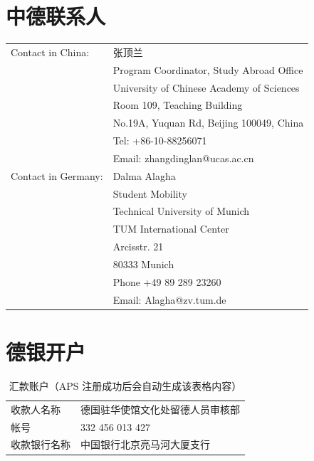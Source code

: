 \documentclass[oneside,final]{book}
\begin{document}
\begin{appendices}

\chapter{中德联系人}

\begin{table}[!htbp]
\centering
\label{tb:contacts}
\begin{tabular}{ll}
\toprule
Contact in China: & 张顶兰 \\
& Program Coordinator, Study Abroad Office \\
& University of Chinese Academy of Sciences \\
& Room 109, Teaching Building \\
& No.19A, Yuquan Rd, Beijing 100049, China \\
& Tel: +86-10-88256071 \\
& Email: zhangdinglan@ucas.ac.cn \\ \midrule
Contact in Germany: & Dalma Alagha \\
& Student Mobility \\
& Technical University of Munich\\
& TUM International Center \\
& Arcisstr. 21 \\
& 80333 Munich \\
& Phone +49 89 289 23260 \\
& Email: Alagha@zv.tum.de \\ \bottomrule
\end{tabular}
\end{table}

\newpage

\chapter{德银开户}\label{ap:bank}
\begin{table}[htbp]
  \caption{汇款账户（APS 注册成功后会自动生成该表格内容）}
  \label{tb:bank-account}
  \centering
  \begin{tabular}{ll}
    \toprule
    收款人名称 & 德国驻华使馆文化处留德人员审核部 \\
    帐号 & 332 456 013 427 \\
    收款银行名称 & 中国银行北京亮马河大厦支行 \\
    \bottomrule
  \end{tabular}
\end{table}


\end{appendices}
\end{document}

